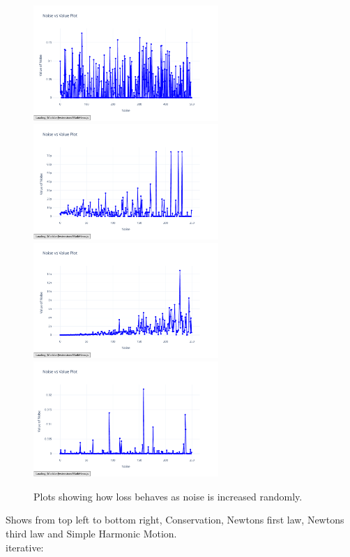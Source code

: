 \documentclass{article}
\begin{document}
\begin{figure}[H]
    \centering
    \includegraphics[width=7cm]{noise_conservation_random}
    \includegraphics[width=7cm]{noise_Newtons_First_Law_random}
    \includegraphics[width=7cm]{noise_Newtons_Third_Law_random}
    \includegraphics[width=7cm]{noise_Simple_Harmonic_Motion}
    \caption{Plots showing how loss behaves as noise is increased randomly.}
    \label{fig:noise_plots}
\end{figure}

Shows from top left to bottom right, Conservation, Newtons first law, Newtons third law and Simple Harmonic Motion. \\

iterative: 
\end{document}
